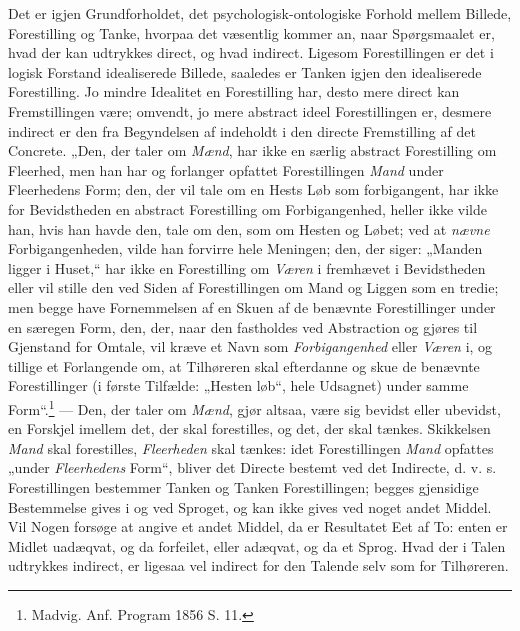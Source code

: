 \documentclass[12pt]{book}
\newcommand{\opage}[1]{\marginnote{\footnotesize\textit{[#1]}}}
\begin{document}
Det er igjen Grundforholdet, det psychologisk-ontologiske
Forhold mellem Billede, Forestilling og Tanke, hvorpaa det
væsentlig kommer an, naar Spørgsmaalet er, hvad der kan
udtrykkes direct, og hvad indirect. Ligesom Forestillingen er
det i logisk Forstand idealiserede Billede, saaledes er Tanken
igjen den idealiserede Forestilling. Jo mindre Idealitet en
Forestilling har, desto mere direct kan Fremstillingen være;
omvendt, jo mere abstract ideel Forestillingen er, desmere
indirect er den fra Begyndelsen af indeholdt i den directe
Fremstilling af det Concrete. „Den, der taler om \emph{Mænd}, har
\opage{39}ikke en særlig abstract Forestilling om Fleerhed, men han har
og forlanger opfattet Forestillingen \emph{Mand} under Fleerhedens
Form; den, der vil tale om en Hests Løb som forbigangent,
har ikke for Bevidstheden en abstract Forestilling om
Forbigangenhed, heller ikke vilde han, hvis han havde den, tale om
den, som om Hesten og Løbet; ved at \emph{nævne}
Forbigangenheden, vilde han forvirre hele Meningen; den, der siger:
„Manden ligger i Huset,“ har ikke en Forestilling om \emph{Væren}
i fremhævet i Bevidstheden eller vil stille den ved Siden af
Forestillingen om Mand og Liggen som en tredie; men begge
have Fornemmelsen af en Skuen af de benævnte Forestillinger
under en særegen Form, den, der, naar den fastholdes ved
Abstraction og gjøres til Gjenstand for Omtale, vil kræve et
Navn som \emph{Forbigangenhed} eller \emph{Væren} i, og tillige et
Forlangende om, at Tilhøreren skal efterdanne og skue de
benævnte Forestillinger (i første Tilfælde: „Hesten løb“, hele
Udsagnet) under samme Form“.\footnote{%
Madvig. Anf. Program 1856 S. 11.} --- Den, der taler om \emph{Mænd},
gjør altsaa, være sig bevidst eller ubevidst, en Forskjel imellem
det, der skal forestilles, og det, der skal tænkes. Skikkelsen
\emph{Mand} skal forestilles, \emph{Fleerheden} skal tænkes: idet
Forestillingen \emph{Mand} opfattes „under \emph{Fleerhedens} Form“, bliver
det Directe bestemt ved det Indirecte, d. v. s. Forestillingen
bestemmer Tanken og Tanken Forestillingen; begges gjensidige
Bestemmelse gives i og ved Sproget, og kan ikke gives ved
noget andet Middel. Vil Nogen forsøge at angive et andet
Middel, da er Resultatet Eet af To: enten er Midlet
uadæqvat, og da forfeilet, eller adæqvat, og da et Sprog. Hvad
der i Talen udtrykkes indirect, er ligesaa vel indirect for den
Talende selv som for Tilhøreren.
\end{document}
